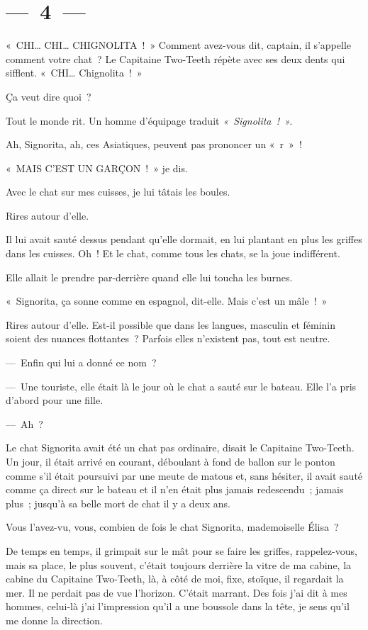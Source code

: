 \documentclass[twoside]{book} %
\begin{document}
\section[{— 4 —}]{— 4 —}
\renewcommand{\leftmark}{— 4 —}

\noindent « CHI… CHI… CHIGNOLITA ! » Comment avez-vous dit, captain, il s’appelle comment votre chat ? Le Capitaine Two-Teeth répète avec ses deux dents qui sifflent. « CHI… Chignolita ! »\par
Ça veut dire quoi ?\par
Tout le monde rit. Un homme d’équipage traduit \emph{« Signolita ! ».}\par
Ah, Signorita, ah, ces Asiatiques, peuvent pas prononcer un « r » !\par
« MAIS C’EST UN GARÇON ! » je dis.\par
Avec le chat sur mes cuisses, je lui tâtais les boules.\par
Rires autour d’elle.\par
Il lui avait sauté dessus pendant qu’elle dormait, en lui plantant en plus les griffes dans les cuisses. Oh ! Et le chat, comme tous les chats, se la joue indifférent.\par
Elle allait le prendre par-derrière quand elle lui toucha les burnes.\par
« Signorita, ça sonne comme en espagnol, dit-elle. Mais c’est un mâle ! »\par
Rires autour d’elle. Est-il possible que dans les langues, masculin et féminin soient des nuances flottantes ? Parfois elles n’existent pas, tout est neutre.\par
— Enfin qui lui a donné ce nom ?\par
— Une touriste, elle était là le jour où le chat a sauté sur le bateau. Elle l’a pris d’abord pour une fille.\par
— Ah ?\par
Le chat Signorita avait été un chat pas ordinaire, disait le Capitaine Two-Teeth. Un jour, il était arrivé en courant, déboulant à fond de ballon sur le ponton comme s’il était poursuivi par une meute de matous et, sans hésiter, il avait sauté comme ça direct sur le bateau et il n’en était plus jamais redescendu ; jamais plus ; jusqu’à sa belle mort de chat il y a deux ans.\par
Vous l’avez-vu, vous, combien de fois le chat Signorita, mademoiselle Élisa ?\par
De temps en temps, il grimpait sur le mât pour se faire les griffes, rappelez-vous, mais sa place, le plus souvent, c’était toujours derrière la vitre de ma cabine, la cabine du Capitaine Two-Teeth, là, à côté de moi, fixe, stoïque, il regardait la mer. Il ne perdait pas de vue l’horizon. C’était marrant. Des fois j’ai dit à mes hommes, celui-là j’ai l’impression qu’il a une boussole dans la tête, je sens qu’il me donne la direction.\par
\end{document}
